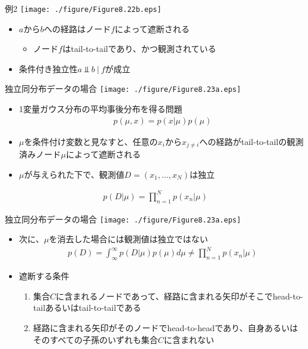 \begin{frame}{例2}
 \texttt{[image: ./figure/Figure8.22b.eps]}
 \begin{itemize}
  \item $a$から$b$への経路はノード$f$によって遮断される
        \begin{itemize}
         \item ノード$f$はtail-to-tailであり、かつ観測されている
        \end{itemize}
  \item 条件付き独立性$a \Perp b\ | \ f$が成立
 \end{itemize}
\end{frame}

\begin{frame}{独立同分布データの場合}
 \texttt{[image: ./figure/Figure8.23a.eps]}
 \begin{itemize}
  \item 1変量ガウス分布の平均事後分布を得る問題
        \begin{eqnarray*}
         p(\mu, x) = p(x|\mu)p(\mu)
        \end{eqnarray*}
  \item $\mu$を条件付け変数と見なすと、任意の$x_i$から$x_{j \neq i}$への経路がtail-to-tailの観測済みノード$\mu$によって遮断される
  \item $\mu$が与えられた下で、観測値$D=(x_1,...,x_N)$は独立
 \end{itemize}
 \begin{eqnarray*}
  p(D|\mu) = \prod_{n=1}^Np(x_n|\mu)
 \end{eqnarray*}
\end{frame}

\begin{frame}{独立同分布データの場合}
 \texttt{[image: ./figure/Figure8.23a.eps]}
 \begin{itemize}
  \item 次に、$\mu$を消去した場合には観測値は独立ではない
        \begin{eqnarray*}
         p(D) = \int_{\infty}^{\infty}p(D|\mu)p(\mu)d\mu \neq  \prod_{n=1}^Np(x_n|\mu)
        \end{eqnarray*}
  \item 遮断する条件
        \begin{enumerate}
         \item \alert{集合$C$に含まれるノードであって}、経路に含まれる矢印がそこでhead-to-tailあるいはtail-to-tailである
         \item 経路に含まれる矢印がそのノードでhead-to-headであり、自身あるいはそのすべての子孫のいずれも集合$C$に含まれない
        \end{enumerate}
 \end{itemize}
\end{frame}


